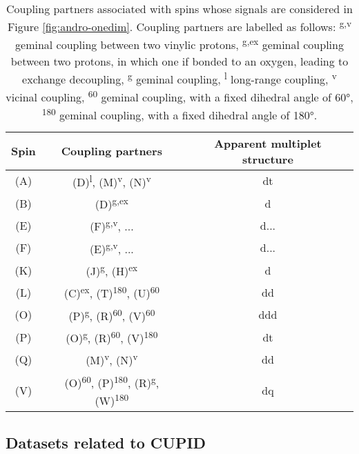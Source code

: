 \begin{table}[h!]
\centering
\begin{tabular}{c c c}
\hline
Spin  & Coupling partners & Apparent multiplet structure \\
\hline
(A) & (D)\textsuperscript{l}, (M)\textsuperscript{v}, (N)\textsuperscript{v} & dt \\
(B) & (D)\textsuperscript{g,ex} & d \\
(E) & (F)\textsuperscript{g,v}, ... & d... \\
(F) & (E)\textsuperscript{g,v}, ... & d... \\
(K) & (J)\textsuperscript{g}, (H)\textsuperscript{ex} & d \\
(L) & (C)\textsuperscript{ex}, (T)\textsuperscript{180}, (U)\textsuperscript{60} & dd \\
(O) & (P)\textsuperscript{g}, (R)\textsuperscript{60}, (V)\textsuperscript{60} & ddd \\
(P) & (O)\textsuperscript{g}, (R)\textsuperscript{60}, (V)\textsuperscript{180} & dt \\
(Q) & (M)\textsuperscript{v}, (N)\textsuperscript{v} & dd \\
(V) & (O)\textsuperscript{60}, (P)\textsuperscript{180}, (R)\textsuperscript{g}, (W)\textsuperscript{180} & dq \\
\hline
\end{tabular}
\caption[
    Andrographolide multiplet structures
]{
    Coupling partners associated with spins whose signals are
    considered in Figure \ref{fig:andro-onedim}.
    Coupling partners are labelled as follows:
    \textsuperscript{g,v} geminal coupling between two vinylic protons,
    \textsuperscript{g,ex} geminal coupling between two protons, in which one
    if bonded to an oxygen, leading to exchange decoupling,
    \textsuperscript{g} geminal coupling,
    \textsuperscript{l} long-range coupling,
    \textsuperscript{v} vicinal coupling,
    \textsuperscript{60} geminal coupling, with a fixed dihedral angle of \ang{60},
    \textsuperscript{180} geminal coupling, with a fixed dihedral angle of \ang{180}.
}
\label{tab:andro-multiplets}
\end{table}


\subsection{Datasets related to \ac{CUPID}}

